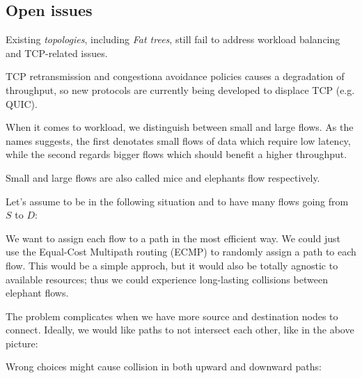 \subsection{Open issues}
Existing \emph{topologies}, including \emph{Fat trees}, still fail to address
workload balancing and TCP-related issues.

\begin{note}
    TCP retransmission and congestiona avoidance policies causes a degradation
    of throughput, so new protocols are currently being developed to displace
    TCP (e.g. QUIC).
\end{note}

\noindent
When it comes to workload, we distinguish between small and large flows. As the
names suggests, the first denotates small flows of data which require low
latency, while the second regards bigger flows which should benefit a higher
throughput.

\begin{note}
    Small and large flows are also called mice and elephants flow respectively.
\end{note}

\begin{eg}
Let's assume to be in the following situation and to have many flows going from
$S$ to $D$:

\begin{figure}[h!]
    \centering
\end{figure}

\noindent
We want to assign each flow to a path in the most efficient way. We could just
use the Equal-Cost Multipath routing (ECMP) to randomly assign a path to each
flow. This would be a simple approch, but it would also be totally agnostic to
available resources; thus we could experience long-lasting collisions between
elephant flows.

\begin{figure}[h!]
    \centering
\end{figure}

\noindent
The problem complicates when we have more source and destination nodes to
connect. Ideally, we would like paths to not intersect each other, like in the
above picture:

\begin{figure}[h!]
    \centering
\end{figure}

\noindent
Wrong choices might cause collision in both upward and downward paths:
\begin{figure}[ht!]
    \centering
    \hspace{1.5cm}
\end{figure}
\end{eg}

